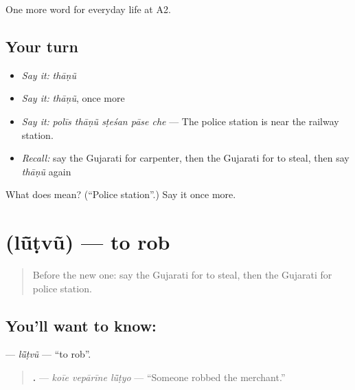 \begin{grammarlens}[title={What you've built}]
One more word for everyday life at A2.
\end{grammarlens}

\subsection*{Your turn}
\begin{itemize}
\raggedright
  \item \emph{Say it:} \emph{thāṇũ}
  \item \emph{Say it:} \emph{thāṇũ}, once more
  \item \emph{Say it:} \emph{polīs thāṇũ sṭeśan pāse che} — The police station is near the railway station.
  \item \emph{Recall:} say the Gujarati for carpenter, then the Gujarati for to steal, then say \emph{thāṇũ} again
\end{itemize}

\begin{tcolorbox}[breakable,colback=teal!4,colframe=teal!35!black,title={Before you move on}]
What does  mean? (\textquotedblleft{}Police station\textquotedblright{}.) Say it once more.
\end{tcolorbox}
\section[\texorpdfstring{\gu{લૂંટવું} (lū̃ṭvũ)}{લૂંટવું (lū̃ṭvũ)}]{ (lū̃ṭvũ) — to rob}

\label{lesson:GU-C202-luntvu}



\begin{quote}
Before the new one: say the Gujarati for to steal, then the Gujarati for police station.
\end{quote}

\subsection*{You'll want to know: }
\textbf{} — \emph{lū̃ṭvũ} — \textquotedblleft{}to rob\textquotedblright{}.

\begin{quote}
\textbf{  .} — \emph{koīe vepārīne lū̃ṭyo} — \textquotedblleft{}Someone robbed the merchant.\textquotedblright{}
\end{quote}

